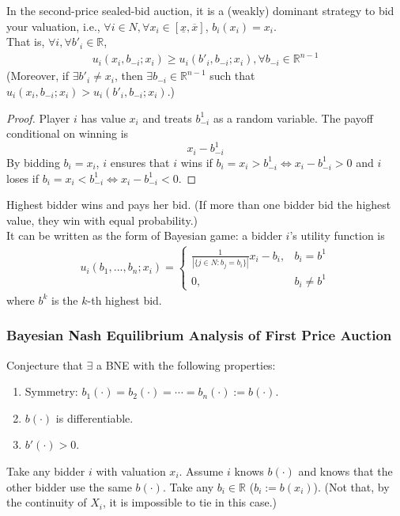 \documentclass[11pt]{elegantbook_2}
\begin{document}
\begin{theorem}
    In the second-price sealed-bid auction, it is a (weakly) dominant strategy to bid your valuation, i.e., $\forall i\in N,\forall x_i\in[\underline{x},\overline{x}]$, $b_i(x_i)=x_i$.\\
    That is, $\forall i, \forall b'_i\in \mathbb{R}$,
    \begin{equation}
        \begin{aligned}
            u_i(x_i,b_{-i};x_i)\geq u_i(b'_i,b_{-i};x_i), \forall b_{-i}\in \mathbb{R}^{n-1}
        \end{aligned}
        \nonumber
    \end{equation}
    (Moreover, if $\exists b'_{i}\neq x_i$, then $\exists b_{-i}\in \mathbb{R}^{n-1}$ such that $u_i(x_i,b_{-i};x_i)> u_i(b'_{i},b_{-i};x_i)$.)
\end{theorem}
\begin{proof}
    Player $i$ has value $x_i$ and treats $b^1_{-i}$ as a random variable. The payoff conditional on winning is $$x_i-b^1_{-i}$$ By bidding $b_i=x_i$, $i$ ensures that $i$ wins if $b_i=x_i>b^1_{-i}\Leftrightarrow x_i-b^1_{-i}>0$ and $i$ loses if $b_i=x_i<b^1_{-i}\Leftrightarrow x_i-b^1_{-i}<0$.
\end{proof}

\begin{definition}
    Highest bidder wins and pays her bid. (If more than one bidder bid the highest value, they win with equal probability.)\\
    It can be written as the form of Bayesian game: a bidder $i$'s utility function is
    \begin{equation}
        \begin{aligned}
            u_i(b_1,...,b_n;x_i)=\left\{\begin{matrix}
                \frac{1}{|\{j\in N:b_j=b_i\}|}x_i-b_i,&b_i=b^1\\
                0,&b_i\neq b^1
            \end{matrix}\right.
        \end{aligned}
        \nonumber
    \end{equation}
    where $b^k$ is the $k$-th highest bid.
\end{definition}


\subsubsection*{Bayesian Nash Equilibrium Analysis of First Price Auction}
Conjecture that $\exists$ a BNE with the following properties:
\begin{enumerate}
    \item Symmetry: $b_1(\cdot)=b_2(\cdot)=\cdots=b_n(\cdot):=b(\cdot)$.
    \item $b(\cdot)$ is differentiable.
    \item $b'(\cdot)>0$.
\end{enumerate}
Take any bidder $i$ with valuation $x_i$. Assume $i$ knows $b(\cdot)$ and knows that the other bidder use the same $b(\cdot)$. Take any $b_i\in \mathbb{R}$ ($b_i:=b(x_i)$). (Not that, by the continuity of $X_i$, it is impossible to tie in this case.)
\end{document}
